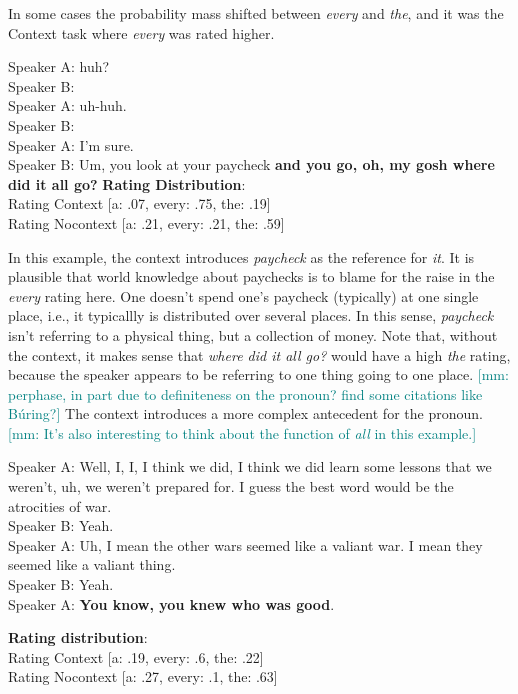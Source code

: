\documentclass[12pt,letterpaper,table,svgnames,dvipsnames]{article}
\newcommand{\mm}[1]{\textcolor{teal}{[mm: #1]}}
\begin{document}
In some cases the probability mass shifted between \emph{every} and \emph{the}, and it was the Context task where \emph{every} was rated higher.
\begin{exe}
\ex {}
    \begin{xlist}
    \ex {}
    Speaker A: huh?\\
    Speaker B: \\
    Speaker A: uh-huh.\\
    Speaker B: \\
    Speaker A: I'm sure.\\
    Speaker B: Um, you look at your paycheck \textbf{and you go, oh, my gosh where did it all go?}
    \ex \textbf{Rating Distribution}:\\
    Rating Context [a: .07, every: .75, the: .19]\\
    Rating Nocontext [a: .21, every: .21, the: .59]
    \end{xlist}
\end{exe}

In this example, the context introduces \emph{paycheck} as the reference for \emph{it}. It is plausible that world knowledge about paychecks is to blame for the raise in the \emph{every} rating here. One doesn't spend one's paycheck (typically) at one single place, i.e., it typicallly is distributed over several places. In this sense, \emph{paycheck} isn't referring to a physical thing, but a collection of money. Note that, without the context, it makes sense that \emph{where did it all go?} would have a high \emph{the} rating, because the speaker appears to be referring to one thing going to one place. \mm{perphase, in part due to definiteness on the pronoun? find some citations like B\'uring?} The context introduces a more complex antecedent for the pronoun. \mm{It's also interesting to think about the function of \emph{all} in this example.}


\begin{exe}
\ex {}
    \begin{xlist}
    \ex {}
    Speaker A: Well, I, I, I think we did, I think we did learn some lessons that we weren't, uh, we weren't prepared for. I guess the best word would be the atrocities of war.\\
    Speaker B: Yeah.\\
    Speaker A: Uh, I mean the other wars seemed like a valiant war. I mean they seemed like a valiant thing.\\
    Speaker B: Yeah.\\
    Speaker A: \textbf{You know, you knew who was good}.
    
    \ex \textbf{Rating distribution}:\\
    Rating Context [a: .19, every: .6, the: .22]\\
    Rating Nocontext [a: .27, every: .1, the: .63]
    \end{xlist}
\end{exe}
\end{document}
